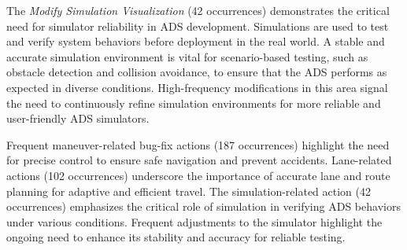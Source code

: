 The \textit{Modify Simulation Visualization} (42 occurrences) demonstrates the critical need for simulator reliability in ADS development. Simulations are used to test and verify system behaviors before deployment in the real world. A stable and accurate simulation environment is vital for scenario-based testing, such as obstacle detection and collision avoidance, to ensure that the ADS performs as expected in diverse conditions. High-frequency modifications in this area signal the need to continuously refine simulation environments for more reliable and user-friendly ADS simulators.


\vspace{-1ex}
\begin{finding}
\label{finding:rq2_combined}
    Frequent maneuver-related bug-fix actions (187 occurrences) highlight the need for precise control to ensure safe navigation and prevent accidents. Lane-related actions (102 occurrences) underscore the importance of accurate lane and route planning for adaptive and efficient travel. The simulation-related action (42 occurrences) emphasizes the critical role of simulation in verifying ADS behaviors under various conditions. Frequent adjustments to the simulator highlight the ongoing need to enhance its stability and accuracy for reliable testing.
\end{finding}
\vspace{-1ex}
